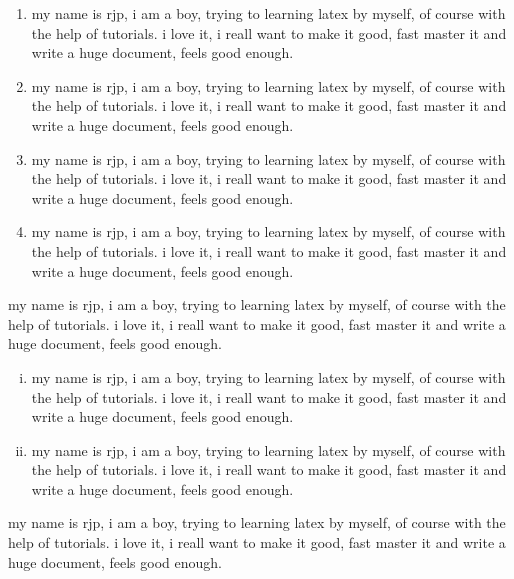 \documentclass[a4paper, UTF8]{article}
\begin{document}
\begin{enumerate}
    \item my name is rjp, i am a boy, trying to learning latex by myself, of course with the help of tutorials. i love it, i reall want to make it good, fast master it and write a huge document, feels good enough.
    \item my name is rjp, i am a boy, trying to learning latex by myself, of course with the help of tutorials. i love it, i reall want to make it good, fast master it and write a huge document, feels good enough.
    \item my name is rjp, i am a boy, trying to learning latex by myself, of course with the help of tutorials. i love it, i reall want to make it good, fast master it and write a huge document, feels good enough.
    \item my name is rjp, i am a boy, trying to learning latex by myself, of course with the help of tutorials. i love it, i reall want to make it good, fast master it and write a huge document, feels good enough.
\end{enumerate}

my name is rjp, i am a boy, trying to learning latex by myself, of course with the help of tutorials. i love it, i reall want to make it good, fast master it and write a huge document, feels good enough.

\begin{enumerate}[i.]
    \item my name is rjp, i am a boy, trying to learning latex by myself, of course with the help of tutorials. i love it, i reall want to make it good, fast master it and write a huge document, feels good enough.
    \item my name is rjp, i am a boy, trying to learning latex by myself, of course with the help of tutorials. i love it, i reall want to make it good, fast master it and write a huge document, feels good enough. 
\end{enumerate}

my name is rjp, i am a boy, trying to learning latex by myself, of course with the help of tutorials. i love it, i reall want to make it good, fast master it and write a huge document, feels good enough.
\end{document}
